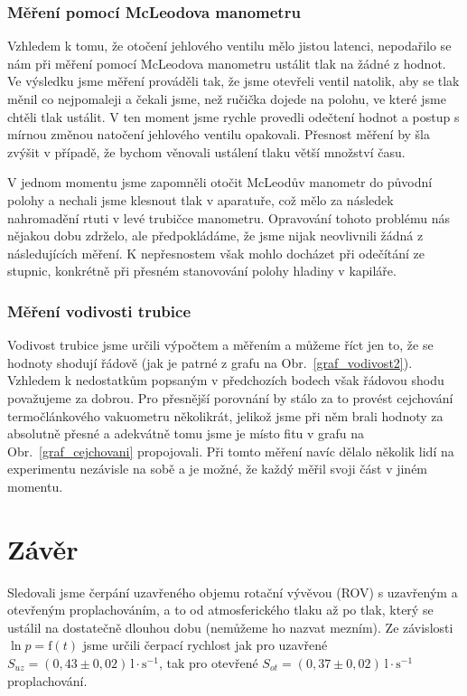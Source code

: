\documentclass[english]{article}
\newcommand{\unit}[1]{\mathrm{#1}}
\begin{document}
	\subsubsection{Měření pomocí McLeodova manometru}
		Vzhledem k tomu, že otočení jehlového ventilu mělo jistou latenci, nepodařilo se nám při měření pomocí McLeodova manometru ustálit tlak na žádné z hodnot. Ve výsledku jsme měření prováděli tak, že jsme otevřeli ventil natolik, aby se tlak měnil co nejpomaleji a čekali jsme, než ručička dojede na polohu, ve které jsme chtěli tlak ustálit. V ten moment jsme rychle provedli odečtení hodnot a postup s mírnou změnou natočení jehlového ventilu opakovali. Přesnost měření by šla zvýšit v případě, že bychom věnovali ustálení tlaku větší množství času.
		
		V jednom momentu jsme zapomněli otočit McLeodův manometr do původní polohy a nechali jsme klesnout tlak v aparatuře, což mělo za následek nahromadění rtuti v levé trubičce manometru. Opravování tohoto problému nás nějakou dobu zdrželo, ale předpokládáme, že jsme nijak neovlivnili žádná z následujících měření. K nepřesnostem však mohlo docházet při odečítání ze stupnic, konkrétně při přesném stanovování polohy hladiny v kapiláře. 
		
	\subsubsection{Měření vodivosti trubice}
		Vodivost trubice jsme určili výpočtem a měřením a můžeme říct jen to, že se hodnoty shodují řádově (jak je patrné z grafu na Obr.~\ref{graf_vodivost2}). Vzhledem k nedostatkům popsaným v předchozích bodech však řádovou shodu považujeme za dobrou. Pro přesnější porovnání by stálo za to provést cejchování termočlánkového vakuometru několikrát, jelikož jsme při něm brali hodnoty za absolutně přesné a adekvátně tomu jsme je místo fitu v grafu na Obr.~\ref{graf_cejchovani} propojovali. Při tomto měření navíc dělalo několik lidí na experimentu nezávisle na sobě a je možné, že každý měřil svoji část v jiném momentu. 
			
						
\section{Závěr}
	Sledovali jsme čerpání uzavřeného objemu rotační vývěvou (ROV) s uzavřeným a otevřeným proplachováním, a to od atmosferického tlaku až po tlak, který se ustálil na dostatečně dlouhou dobu (nemůžeme ho nazvat mezním). Ze závislosti $\ln p = \unit{f}(t)$ jsme určili čerpací rychlost jak pro uzavřené $S_{uz} = (0,43\pm0,02) \, \mathrm{l\cdot s^{-1}}$, tak pro otevřené $S_{ot} = (0,37\pm0,02)~\mathrm{l\cdot s^{-1}}$ proplachování. 
	
\end{document}
